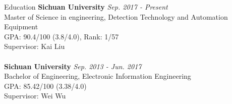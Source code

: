 \documentclass{resume} %
\begin{document}
\begin{rSection}{Education}
	{\bf Sichuan University} \hfill {\em Sep. 2017 - Present} 
	\\ Master of Science in engineering, Detection Technology and Automation Equipment\\ GPA: 90.4/100 (3.8/4.0), Rank: 1/57\\
	Supervisor: Kai Liu\\
	\\{\bf Sichuan University} \hfill {\em Sep. 2013 - Jun. 2017} 
	\\ Bachelor of Engineering, Electronic Information Engineering\\GPA: 85.42/100 (3.38/4.0)\\
	Supervisor: Wei Wu
\end{rSection}
\end{document}

